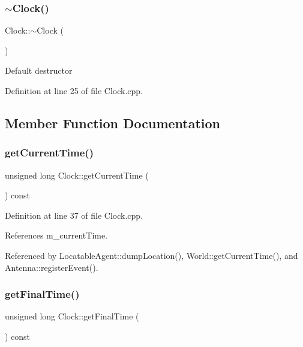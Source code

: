 \mbox{\label{class_clock_afc976ce68fa85e15cc06f9ed47bddb7c}} 
\subsubsection{$\sim$\+Clock()}
{\footnotesize\ttfamily Clock\+::$\sim$\+Clock (\begin{DoxyParamCaption}{ }\end{DoxyParamCaption})\hspace{0.3cm}{\ttfamily [virtual]}}

Default destructor 

Definition at line 25 of file Clock.\+cpp.



\subsection{Member Function Documentation}
\mbox{\label{class_clock_a17b19c062d1f0344f37b57cc2dfdaa14}} 
\subsubsection{get\+Current\+Time()}
{\footnotesize\ttfamily unsigned long Clock\+::get\+Current\+Time (\begin{DoxyParamCaption}{ }\end{DoxyParamCaption}) const}



Definition at line 37 of file Clock.\+cpp.



References m\+\_\+current\+Time.



Referenced by Locatable\+Agent\+::dump\+Location(), World\+::get\+Current\+Time(), and Antenna\+::register\+Event().

\mbox{\label{class_clock_a0b9ef0b9272d6555bb0fdca4978c705d}} 
\subsubsection{get\+Final\+Time()}
{\footnotesize\ttfamily unsigned long Clock\+::get\+Final\+Time (\begin{DoxyParamCaption}{ }\end{DoxyParamCaption}) const}



